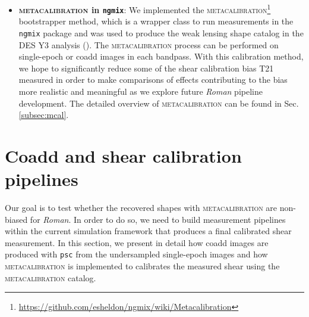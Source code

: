 \documentclass[fleqn,usenatbib]{mnras}
\begin{document}
\begin{itemize}
    \item \textbf{\textsc{metacalibration} in \texttt{ngmix}}: We implemented the \textsc{metacalibration}\footnote{\url{https://github.com/esheldon/ngmix/wiki/Metacalibration}} bootstrapper method, which is a wrapper class to run measurements in the \texttt{ngmix} package and was used to produce the weak lensing shape catalog in the DES Y3 analysis (\citealt{2020arXiv201103408G}). The \textsc{metacalibration} process can be performed on single-epoch or coadd images in each bandpass. With this calibration method, we hope to significantly reduce some of the shear calibration bias T21 measured in order to make comparisons of effects contributing to the bias more realistic and meaningful as we explore future \emph{Roman} pipeline development. The detailed overview of \textsc{metacalibration} can be found in Sec.\ref{subsec:mcal}. 
\end{itemize}



\section{Coadd and shear calibration pipelines}
\label{sec:methods}
Our goal is to test whether the recovered shapes with \textsc{metacalibration} are non-biased for \emph{Roman}. In order to do so, we need to build measurement pipelines within the current simulation framework that produces a final calibrated shear measurement. In this section, we present in detail how coadd images are produced with \texttt{psc} from the undersampled single-epoch images and how \textsc{metacalibration} is implemented to calibrates the measured shear using the \textsc{metacalibration} catalog. 
\end{document}
